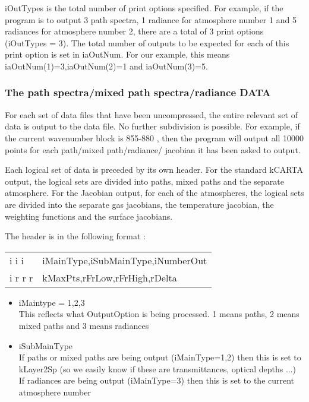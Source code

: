 \documentclass[12pt]{article}
\newlength{\colwidth}
\begin{document}
{{{{iOutTypes is the total number of print options 
specified. For example, if the program is to output 3 path spectra, 1 radiance
for atmosphere number 1 and 5 radiances for atmosphere number 2, there are a 
total of 3 print options (iOutTypes = 3). 
The total number of outputs to be expected for each of this print option is
set in iaOutNum. For our example, this means iaOutNum(1)=3,iaOutNum(2)=1 and
iaOutNum(3)=5.

\subsubsection{The path spectra/mixed path spectra/radiance DATA}
For each set of data files that have 
been uncompressed, the entire relevant set of data is output to the data file. 
No further subdivision is possible. 
For example, if the current wavenumber block is 855-880 \wn, then the program
will output all 10000 points for each path/mixed path/radiance/ jacobian it
has been asked to output.

Each logical set of data is preceded by its own header. For the standard
kCARTA output, the logical sets are divided into paths, mixed paths and the
separate atmosphere. For the Jacobian output, for each of the atmospheres,
the logical sets are divided into the separate gas jacobians, the temperature
jacobian, the weighting functions and the surface jacobians. 

The header is in the following format : 
\begin{longtable}{lp{\colwidth}}
{\sf i i i}    & iMainType,iSubMainType,iNumberOut\\
{\sf i r r r } & kMaxPts,rFrLow,rFrHigh,rDelta \\
\end{longtable}

\begin{itemize}
\item iMaintype = 1,2,3\\
      This reflects what OutputOption is being processed. 1 means paths, 
      2 means mixed paths and 3 means radiances\\

\item iSubMainType \\
      If paths or mixed paths are being output (iMainType=1,2) then this
      is set to kLayer2Sp (so we easily know if these are transmittances,
      optical depths ...)\\
      If radiances are being output (iMainType=3) then this
      is set to the current atmosphere number\\


\end{itemize}}}}}
\end{document}
